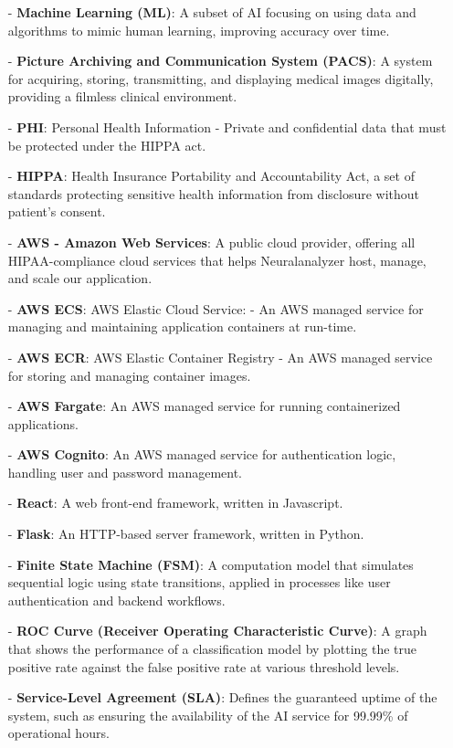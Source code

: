 \documentclass[12pt, titlepage]{article}
\begin{document}
\begin{itemize}
    \item[-] \textbf{Machine Learning (ML)}: A subset of AI focusing on using data and algorithms to mimic human learning, improving accuracy over time.
    \item[-] \textbf{Picture Archiving and Communication System (PACS)}: A system for acquiring, storing, transmitting, and displaying medical images digitally, providing a filmless clinical environment.
    \item[-] \textbf{PHI}: Personal Health Information - Private and confidential data that must be protected under the HIPPA act.
    \item[-] \textbf{HIPPA}: Health Insurance Portability and Accountability Act, a set of standards protecting sensitive health information from disclosure without patient's consent.
    \item[-] \textbf{AWS - Amazon Web Services}: A public cloud provider, offering all HIPAA-compliance cloud services that helps Neuralanalyzer host, manage, and scale our application.
    \item[-] \textbf{AWS ECS}: AWS Elastic Cloud Service: - An AWS managed service for managing and maintaining application containers at run-time.
    \item[-] \textbf{AWS ECR}: AWS Elastic Container Registry - An AWS managed service for storing and managing container images.
    \item[-] \textbf{AWS Fargate}: An AWS managed service for running containerized applications.
    \item[-] \textbf{AWS Cognito}: An AWS managed service for authentication logic, handling user and password management.
    \item[-] \textbf{React}: A web front-end framework, written in Javascript.
    \item[-] \textbf{Flask}: An HTTP-based server framework, written in Python.
    \item[-] \textbf{Finite State Machine (FSM)}: A computation model that simulates sequential logic using state transitions, applied in processes like user authentication and backend workflows.
    
    \item[-] \textbf{ROC Curve (Receiver Operating Characteristic Curve)}: A graph that shows the performance of a classification model by plotting the true positive rate against the false positive rate at various threshold levels.
    
    \item[-] \textbf{Service-Level Agreement (SLA)}: Defines the guaranteed uptime of the system, such as ensuring the availability of the AI service for 99.99\% of operational hours.
    

\end{itemize}
\end{document}
